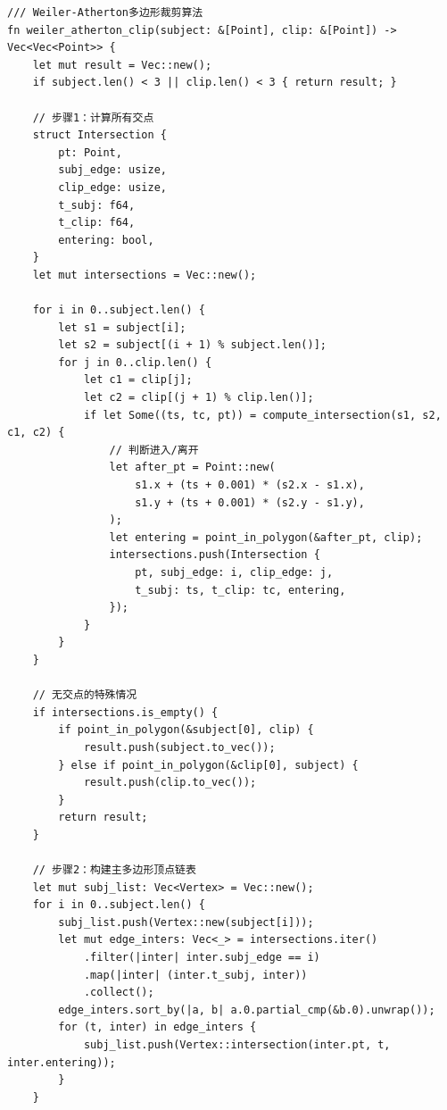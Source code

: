 \documentclass[12pt,a4paper]{article}
\begin{document}
\begin{lstlisting}
/// Weiler-Atherton多边形裁剪算法
fn weiler_atherton_clip(subject: &[Point], clip: &[Point]) -> Vec<Vec<Point>> {
    let mut result = Vec::new();
    if subject.len() < 3 || clip.len() < 3 { return result; }

    // 步骤1：计算所有交点
    struct Intersection {
        pt: Point,
        subj_edge: usize,
        clip_edge: usize,
        t_subj: f64,
        t_clip: f64,
        entering: bool,
    }
    let mut intersections = Vec::new();

    for i in 0..subject.len() {
        let s1 = subject[i];
        let s2 = subject[(i + 1) % subject.len()];
        for j in 0..clip.len() {
            let c1 = clip[j];
            let c2 = clip[(j + 1) % clip.len()];
            if let Some((ts, tc, pt)) = compute_intersection(s1, s2, c1, c2) {
                // 判断进入/离开
                let after_pt = Point::new(
                    s1.x + (ts + 0.001) * (s2.x - s1.x),
                    s1.y + (ts + 0.001) * (s2.y - s1.y),
                );
                let entering = point_in_polygon(&after_pt, clip);
                intersections.push(Intersection {
                    pt, subj_edge: i, clip_edge: j,
                    t_subj: ts, t_clip: tc, entering,
                });
            }
        }
    }

    // 无交点的特殊情况
    if intersections.is_empty() {
        if point_in_polygon(&subject[0], clip) {
            result.push(subject.to_vec());
        } else if point_in_polygon(&clip[0], subject) {
            result.push(clip.to_vec());
        }
        return result;
    }

    // 步骤2：构建主多边形顶点链表
    let mut subj_list: Vec<Vertex> = Vec::new();
    for i in 0..subject.len() {
        subj_list.push(Vertex::new(subject[i]));
        let mut edge_inters: Vec<_> = intersections.iter()
            .filter(|inter| inter.subj_edge == i)
            .map(|inter| (inter.t_subj, inter))
            .collect();
        edge_inters.sort_by(|a, b| a.0.partial_cmp(&b.0).unwrap());
        for (t, inter) in edge_inters {
            subj_list.push(Vertex::intersection(inter.pt, t, inter.entering));
        }
    }
\end{lstlisting}
\end{document}
